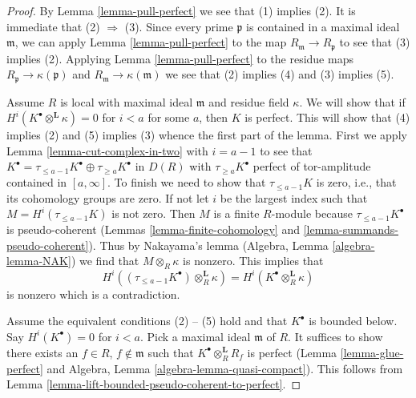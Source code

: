 \documentclass[10pt,a4paper]{amsart}
\theoremstyle{plain}
\theoremstyle{definition}
\theoremstyle{remark}
\numberwithin{equation}{subsection}
\begin{document}
\begin{proof}
By Lemma \ref{lemma-pull-perfect} we see that (1) implies (2).
It is immediate that (2) $\Rightarrow$ (3). Since every prime
$\mathfrak p$ is contained in a maximal ideal $\mathfrak m$,
we can apply Lemma \ref{lemma-pull-perfect} to the map
$R_\mathfrak m \to R_\mathfrak p$ to see that (3) implies (2).
Applying Lemma \ref{lemma-pull-perfect} to the residue maps
$R_\mathfrak p \to \kappa(\mathfrak p)$ and
$R_\mathfrak m \to \kappa(\mathfrak m)$ we see that (2) implies
(4) and (3) implies (5).

\medskip\noindent
Assume $R$ is local with maximal ideal $\mathfrak m$ and
residue field $\kappa$. We will show that if
$H^i(K^\bullet \otimes^\mathbf{L} \kappa) = 0$ for $i < a$
for some $a$, then $K$ is perfect. This will show that
(4) implies (2) and (5) implies (3) whence the first part
of the lemma. First we apply Lemma \ref{lemma-cut-complex-in-two}
with $i = a - 1$ to see that
$K^\bullet = \tau_{\leq a - 1}K^\bullet \oplus \tau_{\geq a}K^\bullet$
in $D(R)$ with $\tau_{\geq a}K^\bullet$ perfect of tor-amplitude
contained in $[a, \infty]$. To finish we need to show that
$\tau_{\leq a - 1}K$ is zero, i.e., that its cohomology groups are zero.
If not let $i$ be the largest index such that $M = H^i(\tau_{\leq a - 1}K)$
is not zero. Then $M$ is a finite $R$-module because
$\tau_{\leq a - 1}K^\bullet$ is pseudo-coherent
(Lemmas \ref{lemma-finite-cohomology} and \ref{lemma-summands-pseudo-coherent}).
Thus by Nakayama's lemma (Algebra, Lemma \ref{algebra-lemma-NAK})
we find that $M \otimes_R \kappa$ is nonzero.
This implies that
$$
H^i((\tau_{\leq a - 1}K^\bullet) \otimes_R^\mathbf{L} \kappa) =
H^i(K^\bullet \otimes_R^\mathbf{L} \kappa)
$$
is nonzero which is a contradiction.

\medskip\noindent
Assume the equivalent conditions (2) -- (5) hold and that
$K^\bullet$ is bounded below. Say $H^i(K^\bullet) = 0$ for
$i < a$. Pick a maximal ideal $\mathfrak m$ of $R$.
It suffices to show there exists an $f \in R$, $f \not \in \mathfrak m$
such that $K^\bullet \otimes_R^\mathbf{L} R_f$ is perfect
(Lemma \ref{lemma-glue-perfect} and
Algebra, Lemma \ref{algebra-lemma-quasi-compact}).
This follows from Lemma \ref{lemma-lift-bounded-pseudo-coherent-to-perfect}.
\end{proof}
\end{document}
